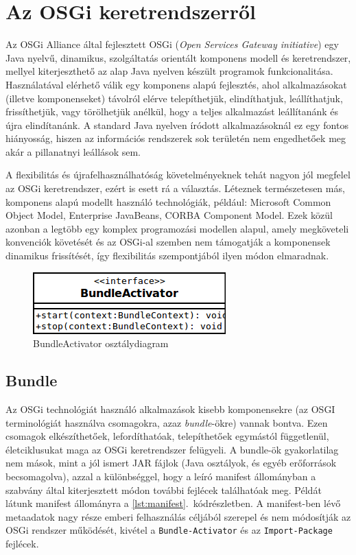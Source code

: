 \chapter{Az OSGi keretrendszerről}
\label{cha:osgi}

Az OSGi Alliance \cite{osgi} által fejlesztett OSGi (\textit{Open Services Gateway initiative}) egy Java nyelvű, dinamikus, szolgáltatás orientált komponens modell és keretrendszer, mellyel kiterjeszthető az alap Java nyelven készült programok funkcionalitása. Használatával elérhető válik egy komponens alapú fejlesztés, ahol alkalmazásokat (illetve komponenseket) távolról elérve telepíthetjük, elindíthatjuk, leállíthatjuk, frissíthetjük, vagy törölhetjük anélkül, hogy a teljes alkalmazást leállítanánk és újra elindítanánk. A standard Java nyelven íródott alkalmazásoknál ez egy fontos hiányosság, hiszen az információs rendszerek sok területén nem engedhetőek meg akár a pillanatnyi leállások sem.

A flexibilitás és újrafelhasználhatóság követelményeknek tehát nagyon jól megfelel az OSGi keretrendszer, ezért is esett rá a választás. Léteznek természetesen más, komponens alapú modellt használó technológiák, például: Microsoft Common Object Model, Enterprise JavaBeans, \mbox{CORBA} Component Model. Ezek közül azonban a legtöbb egy komplex programozási modellen alapul, amely megköveteli konvenciók követését és az OSGi-al szemben nem támogatják a komponensek dinamikus frissítését, így flexibilitás szempontjából ilyen módon elmaradnak.

\begin{figure}[htp]
\centering
\includegraphics[scale=0.6]{img/class_bundleactivator}
\caption{BundleActivator osztálydiagram}
\label{fig:class_bundleactivator}
\end{figure}

\section{Bundle}
\label{sec:bundle}

Az OSGi technológiát \cite{osgiintro}\cite{hall_challenges_2004}\cite{towardosgi} használó alkalmazások kisebb komponensekre (az OSGI terminológiát használva csomagokra, azaz \textit{bundle}-ökre) vannak bontva. Ezen csomagok elkészíthetőek, lefordíthatóak, telepíthetőek egymástól függetlenül, életciklusukat maga az OSGi keretrendszer felügyeli. A bundle-ök gyakorlatilag nem mások, mint a jól ismert JAR fájlok (Java osztályok, és egyéb erőforrások becsomagolva), azzal a különbséggel, hogy a leíró manifest állományban a szabvány által kiterjesztett módon további fejlécek találhatóak meg. Példát látunk manifest állományra a \ref{lst:manifest}.~kódrészletben. A manifest-ben lévő metaadatok nagy része emberi felhasználás céljából szerepel és nem módosítják az OSGi rendszer működését, kivétel a \texttt{Bundle-Activator} és az \texttt{Import-Package} fejlécek.


